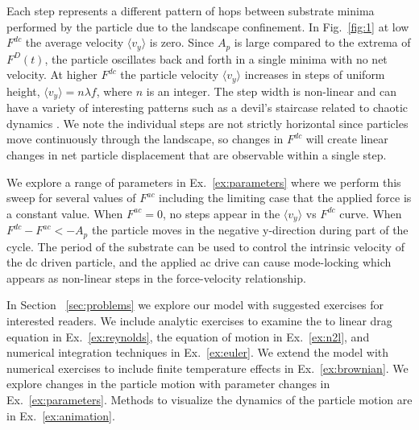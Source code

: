 \documentclass[twocolumn,preprintnumbers,amsmath,amssymb,aps,prx]{revtex4}
\begin{document}
Each step represents a different pattern of hops
between substrate minima
performed by the particle
due to the landscape confinement.  
In Fig.~\ref{fig:1} at %
low $F^{dc}$ the average velocity $\langle v_y \rangle$ is zero.
Since 
$A_p$ is large compared to the extrema of $F^{D}(t)$,
the particle oscillates back and forth
in a single minima with no net velocity.
At higher $F^{dc}$ the particle velocity 
$\langle v_{y} \rangle$ increases in steps of uniform height,
$\langle v_{y} \rangle = n \lambda f$,
where $n$ is an integer.
The step width is non-linear 
and can have a variety of
interesting patterns
such as a devil's staircase related to chaotic dynamics \cite{Bak1986}.
We note the individual steps
are not strictly horizontal 
since particles move continuously
through the landscape, so changes in $F^{dc}$
will create linear changes in 
net particle displacement that are observable
within a single step.



We explore a range of parameters in Ex.~\ref{ex:parameters}
where 
we perform this sweep for several values
of $F^{ac}$ including the limiting case that the applied force
is a constant value.
When $F^{ac} = 0$, no steps appear
in the $\langle v_y \rangle $ vs $F^{dc}$ curve. 
When $F^{dc} - F^{ac} < -A_p$ the particle
moves in the negative y-direction 
during part of the cycle.
The period of the substrate
can be used to control the
intrinsic velocity of the dc driven particle,
and the applied ac drive can cause mode-locking
which appears as non-linear 
steps in the force-velocity relationship.

In Section ~\ref{sec:problems}
we explore our model
with suggested exercises for interested readers.
We include analytic exercises to examine the 
to linear drag equation in Ex.~\ref{ex:reynolds}, 
the equation of motion in Ex.~\ref{ex:n2l},
and 
numerical integration techniques in Ex.~\ref{ex:euler}.
We extend the model with
numerical exercises %
to include finite temperature effects
in Ex.~\ref{ex:brownian}.
We explore changes in the particle motion
with parameter changes in Ex.~\ref{ex:parameters}.
Methods to visualize the dynamics of the particle motion
are in Ex.~\ref{ex:animation}.
\end{document}
